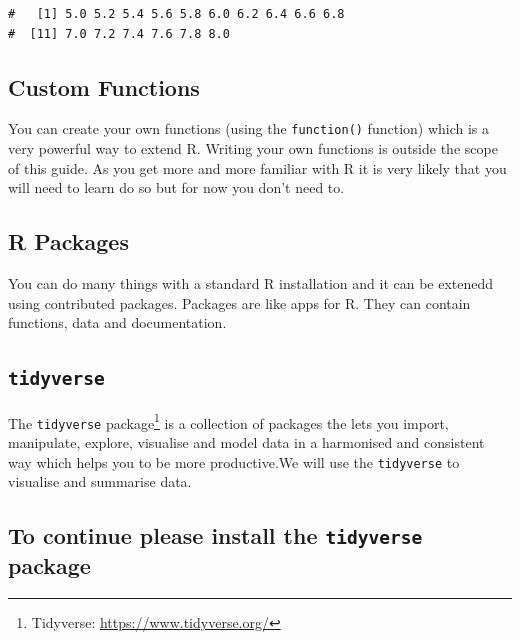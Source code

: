 \documentclass[a4paper,9pt,twocolumn,twoside,printwatermark=false]{pinp}
\begin{document}
\begin{ShadedResult}
\begin{verbatim}
#   [1] 5.0 5.2 5.4 5.6 5.8 6.0 6.2 6.4 6.6 6.8
#  [11] 7.0 7.2 7.4 7.6 7.8 8.0
\end{verbatim}
\end{ShadedResult}

\subsection{Custom Functions}\label{custom-functions}

You can create your own functions (using the \texttt{function()}
function) which is a very powerful way to extend R. Writing your own
functions is outside the scope of this guide. As you get more and more
familiar with R it is very likely that you will need to learn do so but
for now you don't need to.

\subsection{R Packages}\label{r-packages}

You can do many things with a standard R installation and it can be
extenedd using contributed packages. Packages are like apps for R. They
can contain functions, data and documentation.

\subsection{\texorpdfstring{\texttt{tidyverse}}{tidyverse}}\label{tidyverse}

The \texttt{tidyverse} package\footnote{Tidyverse:
  \url{https://www.tidyverse.org/}} is a collection of packages the lets
you import, manipulate, explore, visualise and model data in a
harmonised and consistent way which helps you to be more productive.We
will use the \texttt{tidyverse} to visualise and summarise data.

\subsection{\texorpdfstring{To continue please install the
\texttt{tidyverse}
package}{To continue please install the tidyverse package}}\label{to-continue-please-install-the-tidyverse-package}

\begin{Shaded}
\begin{Highlighting}[]
\NormalTok{(}\NormalTok{)}
\end{Highlighting}
\end{Shaded}
\end{document}
